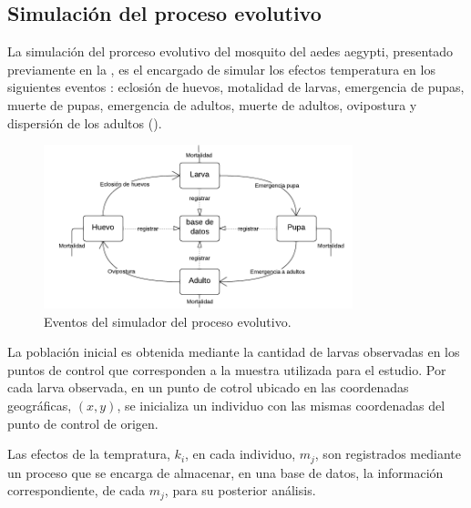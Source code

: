 \subsection{Simulación del proceso evolutivo}
La simulación del prorceso evolutivo del mosquito del aedes aegypti, presentado previamente en la
, es el encargado de simular los efectos temperatura
en los siguientes eventos : eclosión de huevos, motalidad de larvas, emergencia de pupas, muerte
de pupas, emergencia de adultos, muerte de adultos, ovipostura y dispersión de los adultos
().

\begin{figure}[H]
\centering
\includegraphics[width=0.8\textwidth]{capitulo-5/graphics/proceso-evolutivo.png}
\caption{\label{fig:cap-5-proceso-evolutivo} Eventos del simulador del proceso evolutivo.}
\end{figure}

La población inicial es obtenida mediante la cantidad de larvas observadas en los puntos de
control que corresponden a la muestra utilizada para el estudio. Por cada larva observada,
en un punto de cotrol ubicado en las coordenadas geográficas, $(x, y)$, se inicializa un individuo
con las mismas coordenadas del punto de control de origen.

Las efectos de la tempratura, $k_{i}$, en cada individuo, $m_{j}$, son registrados mediante un
proceso que se encarga de almacenar, en una base de datos, la información correspondiente, de cada
$m_{j}$, para su posterior análisis.
